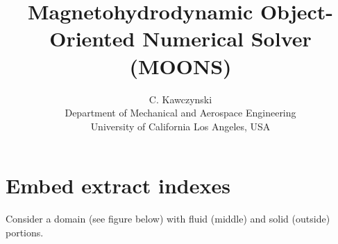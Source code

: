 \documentclass[11pt]{article}
\begin{document}
\doublespacing
\title{Magnetohydrodynamic Object-Oriented Numerical Solver (MOONS)}
\author{C. Kawczynski \\
Department of Mechanical and Aerospace Engineering \\
University of California Los Angeles, USA\\
}

\section{Embed extract indexes}

Consider a domain (see figure below) with fluid (middle) and solid (outside) portions.
\end{document}
